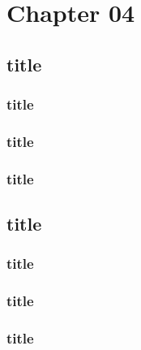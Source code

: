 \chapter{Chapter 04}
\lipsum[2]

\section{title}
\lipsum[1-3]
\subsection{title}
\lipsum[1-3]
\subsection{title}
\lipsum[1-3]
\subsection{title}
\lipsum[1-3]
\section{title}
\lipsum[1-3]
\subsection{title}
\lipsum[1-3]
\subsection{title}
\lipsum[1-3]
\subsection{title}
\lipsum[1-3]